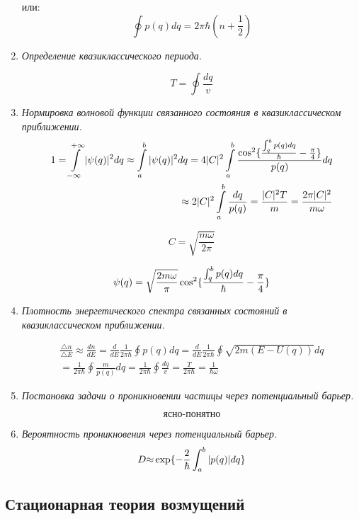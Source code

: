 \documentclass{article}
\begin{document}
\begin{enumerate}
или: 
\begin{equation}
\oint p(q)dq=2\pi\hbar(n+\frac{1}{2})
\end{equation}


		\item \textit{Определение квазиклассического периода.} 

\begin{equation}
T=\oint\frac{dq}{v}
\end{equation}


		\item \textit{Нормировка волновой функции связанного состояния в квазиклассическом приближении.} 
\begin{equation}
\begin{split}
1=\intop_{-\infty}^{+\infty}|\psi(q)|^{2}dq\approx\intop_{a}^{b}|\psi(q)|^{2}dq=4|C|^{2}\intop_{a}^{b}\frac{\cos^{2}\{\frac{\intop_{q}^{b}p(q)dq}{\hbar}-\frac{\pi}{4}\}}{p(q)}dq \\
\approx2|C|^{2}\intop_{a}^{b}\frac{dq}{p(q)}=\frac{|C|^{2}T}{m}=\frac{2\pi|C|^{2}}{m\omega}
\end{split}
\end{equation}


\begin{equation}
C=\sqrt{\frac{m\omega}{2\pi}}
\end{equation}


\begin{equation}
\psi(q)=\sqrt{\frac{2m\omega}{\pi}}\cos^{2}\{\frac{\intop_{q}^{b}p(q)dq}{\hbar}-\frac{\pi}{4}\}
\end{equation}


		\item \textit{Плотность энергетического спектра связанных состояний в квазиклассическом приближении.} 

\begin{equation}
\begin{split}
\frac{\triangle n}{\triangle E}\approx\frac{dn}{dE}=\frac{d}{dE}\frac{1}{2\pi\hbar}\oint p(q)dq=\frac{d}{dE}\frac{1}{2\pi\hbar}\oint\sqrt{2m(E-U(q))}dq \\
=\frac{1}{2\pi\hbar}\oint\frac{m}{p(q)}dq=\frac{1}{2\pi\hbar}\oint\frac{dq}{v}=\frac{T}{2\pi\hbar}=\frac{1}{\hbar\omega}
\end{split}
\end{equation}


		\item \textit{Постановка задачи о проникновении частицы через потенциальный барьер.} 

\begin{equation}
\text{ясно-понятно}
\end{equation}


		\item \textit{Вероятность проникновения через потенциальный барьер.}
\begin{equation}
D\text{\ensuremath{\approx}}\exp\{-\frac{2}{\hbar}\int_{a}^{b}|p(q)|dq\}
\end{equation}
	\end{enumerate}
	
\subsection*{Стационарная теория возмущений}
\end{document}

